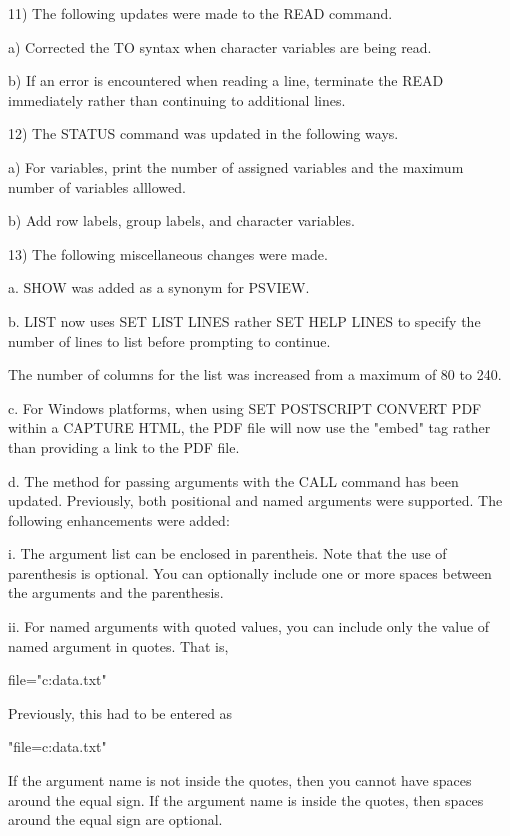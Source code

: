 11) The following updates were made to the READ command.

    a) Corrected the TO syntax when character variables are being
       read.

    b) If an error is encountered when reading a line, terminate the
       READ immediately rather than continuing to additional lines.

12) The STATUS command was updated in the following ways.

    a) For variables, print the number of assigned variables and the
       maximum number of variables alllowed.

    b) Add row labels, group labels, and character variables.

13) The following miscellaneous changes were made.

    a. SHOW was added as a synonym for PSVIEW.

    b. LIST now uses SET LIST LINES rather SET HELP LINES to specify the
       number of lines to list before prompting to continue.

       The number of columns for the list was increased from a maximum of
       80 to 240.

    c. For Windows platforms, when using SET POSTSCRIPT CONVERT PDF
       within a CAPTURE HTML, the PDF file will now use the "embed"
       tag rather than providing a link to the PDF file.

    d. The method for passing arguments with the CALL command has been
       updated.  Previously, both positional and named arguments were
       supported.  The following enhancements were added:

           i. The argument list can be enclosed in parentheis.  Note that
              the use of parenthesis is optional.  You can optionally
              include one or more spaces between the arguments and the
              parenthesis.

          ii. For named arguments with quoted values, you can include
              only the value of named argument in quotes.  That is,

                  file="c:\my data\test.txt"

              Previously, this had to be entered as

                  "file=c:\my data\test.txt"


              If the argument name is not inside the quotes, then you
              cannot have spaces around the equal sign.  If the argument
              name is inside the quotes, then spaces around the equal sign
              are optional.


